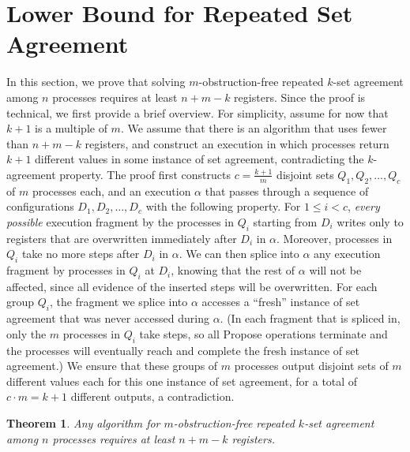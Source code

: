 \documentclass[11pt]{article}
\newtheorem{theorem}{Theorem}
\newcounter{ind}
\begin{document}
\section{Lower Bound for Repeated Set Agreement}
\label{sec-repeated-lower}
\indent

In this section, we prove that solving $m$-obstruction-free repeated $k$-set agreement among $n$ processes requires at least $n+m-k$ registers.  Since the proof is technical, we first provide
a brief overview.  For simplicity, assume for now 
that $k+1$ is a multiple of $m$.
We assume that there is an algorithm
that uses fewer than $n+m-k$ registers, and construct
an execution in which processes return $k+1$ different values in
some instance of set agreement, contradicting the $k$-agreement property.
The proof first constructs $c=\frac{k+1}{m}$ disjoint sets $Q_1,Q_2, \ldots, Q_{c}$ of $m$ processes each, and an execution $\alpha$ 
that passes through a sequence
of configurations $D_1,D_2, \ldots, D_{c}$ with the following property. 
For $1\leq i<c$, 
{\it every possible} execution fragment by the processes in $Q_i$ starting from $D_i$ 
writes only to registers that are overwritten immediately after $D_i$ 
in $\alpha$.
Moreover, processes in $Q_i$ take no more steps after $D_i$ in $\alpha$.
We can then splice into $\alpha$ 
any execution fragment by processes in $Q_i$ at $D_i$, knowing that 
the rest of $\alpha$ will not be affected, since all evidence
of the inserted steps will be overwritten.
For each group $Q_i$, the fragment we splice into $\alpha$
accesses
a ``fresh'' instance of set agreement that was never accessed during
$\alpha$.  (In each fragment that is spliced in, only the $m$
processes in $Q_i$ take steps, so all {\sc Propose} operations terminate
and the processes will eventually reach and complete 
the fresh instance of set agreement.)
We ensure that these groups of $m$ processes output
disjoint sets of $m$ different values each for this one instance of set agreement, for a total of  $c\cdot m = k+1$ different outputs, a contradiction.

\begin{theorem}
\label{repeated-lower-bound}
Any algorithm for $m$-obstruction-free repeated $k$-set agreement among $n$ processes requires at least $n+m-k$ registers.
\end{theorem}
\end{document}
